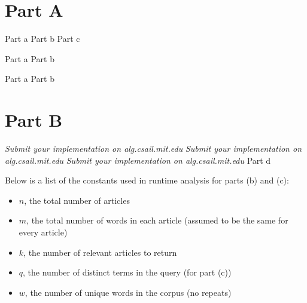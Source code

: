 \documentclass[12pt,twoside]{article}
\begin{document}

\begin{problems}

\section*{Part A}

\problem  %

\begin{problemparts}
\problempart Part a  %
\problempart Part b  %
\problempart Part c  %
\end{problemparts}

\problem  %

\begin{problemparts}
\problempart Part a %
\problempart Part b %
\end{problemparts}

\problem  %

\begin{problemparts}
\problempart Part a %
\problempart Part b %
\end{problemparts}

\section*{Part B}

\problem
\begin{problemparts}
\problempart \emph{Submit your implementation on alg.csail.mit.edu}
\problempart \emph{Submit your implementation on alg.csail.mit.edu}
\problempart \emph{Submit your implementation on alg.csail.mit.edu}
\problempart Part d %

Below is a list of the constants used in runtime analysis for parts (b) and (c):
\begin{itemize}
	\item $n$, the total number of articles
	\item $m$, the total number of words in each article (assumed to be the same for every article)
	\item $k$, the number of relevant articles to return
	\item $q$, the number of distinct terms in the query (for part (c))
	\item $w$, the number of unique words in the corpus (no repeats)
\end{itemize}


\end{problemparts}
\end{problems}
\end{document}
